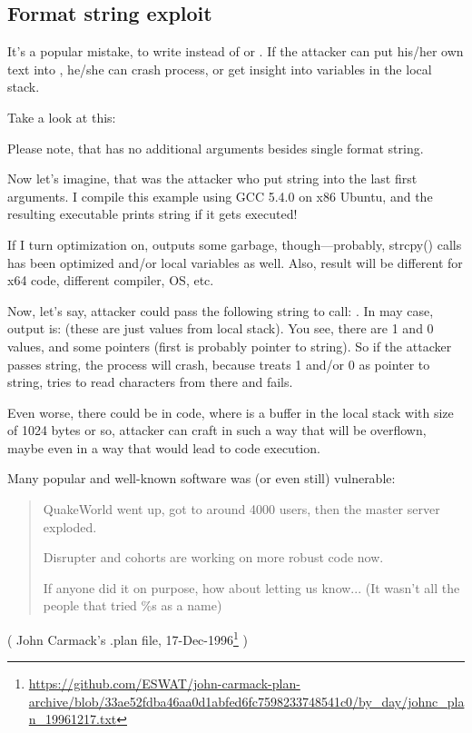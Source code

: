 \subsection{Format string exploit}

It's a popular mistake, to write  instead of  or .
If the attacker can put his/her own text into , he/she can crash process,
or get insight into variables in the local stack.

Take a look at this:



Please note, that \printf has no additional arguments besides single format string.

Now let's imagine, that was the attacker who put  string into the last \printf first arguments.
I compile this example using GCC 5.4.0 on x86 Ubuntu, and the resulting executable prints  string if it gets executed!

If I turn optimization on, \printf outputs some garbage, though---probably, strcpy() calls has been optimized and/or
local variables as well.
Also, result will be different for x64 code, different compiler, \ac{OS}, etc.

Now, let's say, attacker could pass the following string to \printf call: .
In may case, output is:  (these are just values from local stack).
You see, there are 1 and 0 values, and some pointers (first is probably pointer to  string).
So if the attacker passes  string, the process will crash, because \printf treats 1 and/or 0
as pointer to string, tries to read characters from there and fails.

Even worse, there could be  in code, where  is a buffer in the local stack
with size of 1024 bytes or so, attacker can craft  in such a way that  will be overflown,
maybe even in a way that would lead to code execution.

Many popular and well-known software was (or even still) vulnerable:

\begin{framed}
\begin{quotation}
QuakeWorld went up, got to around 4000 users, then the master server exploded.

Disrupter and cohorts are working on more robust code now.

If anyone did it on purpose, how about letting us know... (It wasn't all the people that tried \%s as a name)
\end{quotation}
\end{framed}
( John Carmack's .plan file, 17-Dec-1996\footnote{\url{https://github.com/ESWAT/john-carmack-plan-archive/blob/33ae52fdba46aa0d1abfed6fc7598233748541c0/by_day/johnc_plan_19961217.txt}} )

